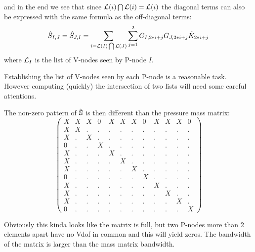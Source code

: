 and in the end we see that since ${\cal L}(i) \bigcap {\cal L}(i) = {\cal L}(i)$
the diagonal terms can also be expressed with the same formula as the off-diagonal terms:
\[
\hat{S}_{I,J} = \hat{S}_{J,I} = \sum_{i= {\cal L}(I) \bigcap {\cal L}(J)} 
\sum_{j=1}^2 G_{I,2*i+j} G_{J,2*i+j} \tilde{K}_{2*i+j} 
\]
where ${\cal L}_I$ is the list of V-nodes seen by P-node $I$.

Establishing the list of V-nodes seen by each P-node is a reasonable task. However computing (quickly)
the intersection of two lists will need some careful attentions.

The non-zero pattern of $\hat{{\mathbb{S}}}$ is then different than the pressure mass matrix:
\[
\left(
\begin{array}{cccccccccccc}
X&X&X&0&X&X&X&0&X&X&X&0 \\
X&X&.&.&.&.&.&.&.&.&.&. \\
X&.&X&.&.&.&.&.&.&.&.&. \\
0&.&.&X&.&.&.&.&.&.&.&. \\
X&.&.&.&X&.&.&.&.&.&.&. \\
X&.&.&.&.&X&.&.&.&.&.&. \\
X&.&.&.&.&.&X&.&.&.&.&. \\
0&.&.&.&.&.&.&X&.&.&.&. \\
X&.&.&.&.&.&.&.&X&.&.&. \\
X&.&.&.&.&.&.&.&.&X&.&. \\
X&.&.&.&.&.&.&.&.&.&X&. \\
0&.&.&.&.&.&.&.&.&.&.&X 
\end{array}
\right)
\]

Obviously this kinda looks like the matrix is full, but two P-nodes more than 2 elements apart have no 
Vdof in common and this will yield zeros. The bandwidth of the matrix is larger than the mass matrix 
bandwidth.

\newpage

